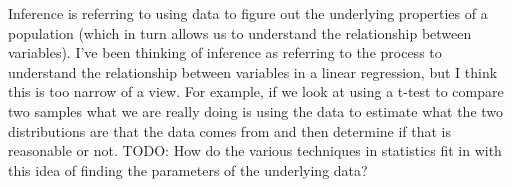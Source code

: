 \documentclass[paper=a4, fontsize=11pt]{scrartcl} %
\numberwithin{equation}{section} %
\numberwithin{figure}{section} %
\numberwithin{table}{section} %
\begin{document}
Inference is referring to using data to figure out the underlying properties of a population (which in turn allows us to understand the relationship between variables). I've been thinking of inference as referring to the process to understand the relationship between variables in a linear regression, but I think this is too narrow of a view. For example, if we look at using a t-test to compare two samples what we are really doing is using the data to estimate what the two distributions are that the data comes from and then determine if that is reasonable or not. TODO: How do the various techniques in statistics fit in with this idea of finding the parameters of the underlying data?


\clearpage
\printglossaries
\end{document}

